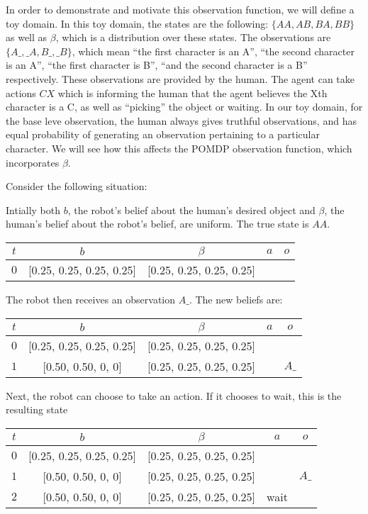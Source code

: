 \documentclass{article}
\begin{document}
In order to demonstrate and motivate this observation function, we will define a toy domain. In this toy domain, the states are the following: $\{AA, AB, BA, BB\}$ as well as $\beta$, which is a distribution over these states. The observations are $\{A\_, \_A, B\_, \_B\}$, which mean ``the first character is an A'', ``the second character is an A'', ``the first character is B'', ``and the second character is a B'' respectively. These observations are provided by the human. The agent can take actions $CX$ which is informing the human that the agent believes the Xth character is a C, as well as ``picking'' the object or waiting. In our toy domain, for the base leve observation, the human always gives truthful observations, and has equal probability of generating an observation pertaining to a particular character. We will see how this affects the POMDP observation function, which incorporates $\beta$. 

Consider the following situation: 

Intially both $b$, the robot's belief about the human's desired object and $\beta$, the human's belief about the robot's belief, are uniform. The true state is $AA$. 

\begin{center}
\begin{tabular}{|c| c| c| c | c|}
	\hline
	$t$ & $b$ & $\beta$ & $a$ & $o$ \\
	\hline
	$0$ & [0.25, 0.25, 0.25, 0.25] & [0.25, 0.25, 0.25, 0.25] & & \\
	\hline
\end{tabular}
\end{center}


The robot then receives an observation $A\_$. The new beliefs are: 

\begin{center}
\begin{tabular}{|c| c| c| c | c|}
	\hline
	$t$ & $b$ & $\beta$ & $a$ & $o$ \\
	\hline
	$0$ & [0.25, 0.25, 0.25, 0.25] & [0.25, 0.25, 0.25, 0.25] & & \\
	\hline
	$1$ & [0.50, 0.50, 0, 0] & [0.25, 0.25, 0.25, 0.25] & & $A\_$ \\
	\hline
\end{tabular}
\end{center}

Next, the robot can choose to take an action. If it chooses to wait, this is the resulting state


\begin{center}
\begin{tabular}{|c| c| c| c | c|}
	\hline
	$t$ & $b$ & $\beta$ & $a$ & $o$ \\
	\hline
	$0$ & [0.25, 0.25, 0.25, 0.25] & [0.25, 0.25, 0.25, 0.25] & & \\
	\hline
	$1$ & [0.50, 0.50, 0, 0] & [0.25, 0.25, 0.25, 0.25] & & $A\_$ \\
	\hline
	$2$ & [0.50, 0.50, 0, 0] & [0.25, 0.25, 0.25, 0.25] & wait  &  \\
	\hline
\end{tabular}
\end{center}
\end{document}

